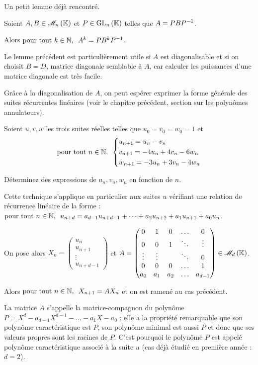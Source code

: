 Un petit lemme déjà rencontré.

\begin{lem}
Soient \(A,B\in\M{n}\) et \(P\in\GL{n}\) telles que \(A=PBP^{-1}\).

Alors \(\quantifs{\tpt k\in\N}A^k=PB^kP\inv\).
\end{lem}

Le lemme précédent est particulièrement utile si \(A\) est diagonalisable et si on choisit \(B=D\), matrice diagonale semblable à \(A\), car calculer les puissances d'une matrice diagonale est très facile.

Grâce à la diagonalisation de \(A\), on peut espérer exprimer la forme générale des suites récurrentes linéaires (voir le chapitre précédent, section sur les polynômes annulateurs).

\begin{exo}
Soient \(u,v,w\) les trois suites réelles telles que \(u_0=v_0=w_0=1\) et \[\quantifs{\tpt n\in\N}\begin{dcases}
u_{n+1}=u_n-v_n \\
v_{n+1}=-4u_n+4v_n-6w_n \\
w_{n+1}=-3u_n+3v_n-4w_n
\end{dcases}\]

Déterminez des expressions de \(u_n,v_n,w_n\) en fonction de \(n\).
\end{exo}

Cette technique s'applique en particulier aux suites \(u\) vérifiant une relation de récurrence linéaire de la forme : \(\quantifs{\tpt n\in\N}u_{n+d}=a_{d-1}u_{n+d-1}+\dots+a_2u_{n+2}+a_1u_{n+1}+a_0u_n\).

On pose alors \(X_n=\begin{pmatrix}
u_n \\
u_{n+1} \\
\vdots \\
u_{n+d-1}
\end{pmatrix}\) et \(A=\begin{pmatrix}
0 & 1 & 0 & \dots & 0 \\
0 & 0 & 1 & \ddots & \vdots \\
\vdots & \vdots &  & \ddots & 0 \\
0 & 0 & 0 & \dots & 1 \\
a_0 & a_1 & a_2 & \dots & a_{d-1}
\end{pmatrix}\in\M{d}\).

Alors \(\quantifs{\tpt n\in\N}X_{n+1}=AX_n\) et on est ramené au cas précédent.

La matrice \(A\) s'appelle la matrice-compagnon du polynôme \(P=X^d-a_{d-1}X^{d-1}-\dots-a_1X-a_0\) : elle a la propriété remarquable que son polynôme caractéristique est \(P\), son polynôme minimal est aussi \(P\) et donc que ses valeurs propres sont les racines de \(P\). C'est pourquoi le polynôme \(P\) est appelé polynôme caractéristique associé à la suite \(u\) (cas déjà étudié en première année : \(d=2\)).

